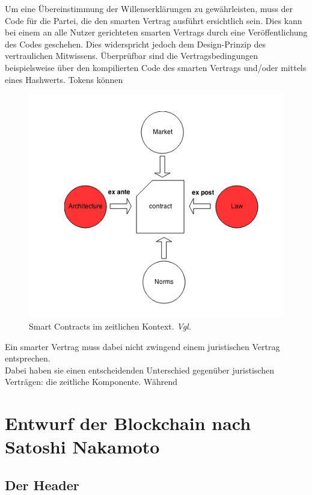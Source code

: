 Um eine Übereinstimmung der Willenserklärungen zu gewährleisten, muss der Code für die Partei, die den smarten Vertrag ausführt ersichtlich sein. Dies kann bei einem an alle Nutzer gerichteten smarten Vertrags durch eine Veröffentlichung des Codes geschehen. Dies widerspricht jedoch dem Design-Prinzip des vertraulichen Mitwissens. 
Überprüfbar sind die Vertragsbedingungen beispielsweise über den kompilierten Code des smarten Vertrags und/oder mittels eines Hashwerts. 
Tokens können 

\begin{figure}[ht]
	\centering
	\includegraphics[scale=0.75]{grafiken/smart_contract_time_dimension.png}
	\caption{Smart Contracts im zeitlichen Kontext.  \textit{Vgl. \cite{Glatz.2014}}}
	\label{smart_contracts_time_dimension}
\end{figure}


Ein smarter Vertrag muss dabei nicht zwingend einem juristischen Vertrag entsprechen.\\

 Dabei haben sie einen entscheidenden Unterschied gegenüber juristischen Verträgen: die zeitliche Komponente. Während 
\section{Entwurf der Blockchain nach Satoshi Nakamoto}
\subsection{Der Header}


